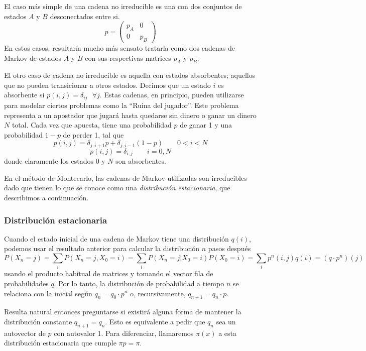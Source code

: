 El caso más simple de una cadena no irreducible es una con dos conjuntos de estados $A$ y $B$ desconectados entre si.
\[ p =
\begin{pmatrix}
 p_A & 0\\
 0 & p_B
\end{pmatrix} \]
En estos casos, resultaría mucho más sensato tratarla como dos cadenas de Markov de estados $A$ y $B$ con sus respectivas matrices $p_A$ y $p_B$.

El otro caso de cadena no irreducible es aquella con estados absorbentes\cite[pp. 6]{BOOK:DURRET}; aquellos que no pueden transicionar a otros estados.
Decimos que un estado $i$ es absorbente si $p(i,j)=\delta_{ij} \text{ } \forall j$.
Estas cadenas, en principio, pueden utilizarse para modelar ciertos problemas como la ``Ruina del jugador''\cite[pp. 1]{BOOK:DURRET}. 
Este problema representa a un apostador que jugará hasta quedarse sin dinero o ganar un dinero $N$ total.
Cada vez que apuesta, tiene una probabilidad $p$ de ganar 1 y una probabilidad $1-p$ de perder 1, tal que
\[ p(i,j) = \delta_{j,i+1}p+\delta_{j,i-1}(1-p) \qquad 0<i<N \]
\[ p(i,j) = \delta_{i,j} \qquad i=0,N \]
donde claramente los estados $0$ y $N$ son absorbentes.

En el método de Montecarlo, las cadenas de Markov utilizadas son irreducibles dado que tienen lo que se conoce como una \textit{distribución estacionaria}, que describimos a continuación.

\subsubsection{Distribución estacionaria}

Cuando el estado inicial de una cadena de Markov tiene una distribución $q(i)$, podemos usar el resultado anterior para calcular la distribución $n$ pasos después
\[ P(X_n=j) = \sum_i P(X_n=j,X_0=i) =  \sum_i P(X_n=j|X_0=i)P(X_0=i) = \sum_i p^n(i,j)q(i) = (q\cdot p^n)(j)\]
usando el producto habitual de matrices y tomando el vector fila de probabilidades $q$.
Por lo tanto, la distribución de probabilidad a tiempo $n$ se relaciona con la inicial según $q_n = q_0\cdot p^n$ o, recursivamente, $q_{n+1} = q_n\cdot p$.

Resulta natural entonces preguntarse si existirá alguna forma de mantener la distribución constante $q_{n+1} = q_n$.
Esto es equivalente a pedir que $q_n$ sea un autovector de $p$ con autovalor 1.
Para diferenciar, llamaremos $\pi(x)$ a esta distribución estacionaria que cumple $\pi p = \pi$.

